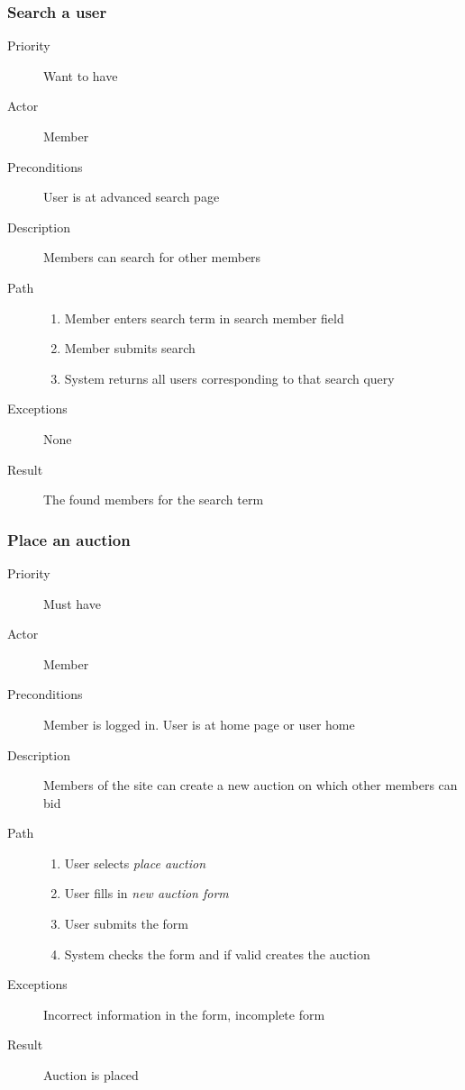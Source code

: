 \documentclass[a4paper, 12pt]{report}
\begin{document}
		\subsubsection{Search a user}
			\begin{description}
				\item[Priority] Want to have
				\item[Actor] Member
				\item[Preconditions] User is at advanced search page
				\item[Description] Members can search for other members 
				\item[Path]
 					\begin{enumerate}
						\item Member enters search term in search member field
						\item Member submits search
						\item System returns all users corresponding to that search 
						query
					\end{enumerate}
				\item[Exceptions] None
				\item[Result] The found members for the search term
			\end{description}
		\subsubsection{Place an auction}
			\begin{description}
				\item[Priority] Must have
				\item[Actor] Member
				\item[Preconditions] Member is logged in. User is at home page or user home
				\item[Description] Members of the site can create a new auction on which
				other members can bid
				\item[Path]
 					\begin{enumerate}
						\item User selects \emph{place auction}
						\item User fills in \emph{new auction form}
						\item User submits the form
						\item System checks the form and if valid creates the auction
					\end{enumerate}
				\item[Exceptions] Incorrect information in the form, incomplete form
				\item[Result] Auction is placed
			\end{description}
\end{document}
